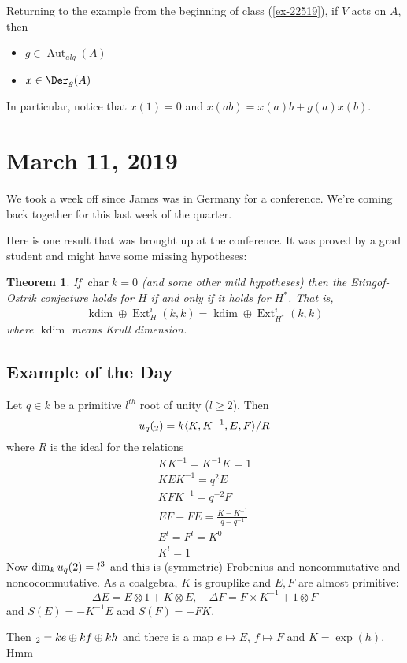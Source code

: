 \documentclass[12pt]{article}
\theoremstyle{break}
\theoremstyle{nonumberbreak}
\theoremstyle{changebreak}
\newtheorem{thm}{Theorem}[subsection]
\theoremstyle{break}
\theoremstyle{nonumberbreak}
\theoremstyle{nonumberplain}
\theoremstyle{change}
\DeclareMathOperator{\Aut}{Aut}
\DeclareMathOperator{\Ext}{Ext}
\DeclareMathOperator{\ch}{char}
\begin{document}
Returning to the example from the beginning of class (\ref{ex-22519}), if $V$ acts on $A$,
then 
\begin{itemize}
	\item $g\in \Aut_{alg}(A)$
	\item $x\in\Der_g(A)$
\end{itemize}
In particular, notice that $x(1)=0$ and $x(ab)=x(a)b+g(a)x(b)$.

\section{March 11, 2019}
We took a week off since James was in Germany for a conference. We're coming back together for this
last week of the quarter.

Here is one result that was brought up at the conference. It was proved by a grad student and might 
have some missing hypotheses:
\begin{thm}
	If $\ch k=0$ (and some other mild hypotheses) then the Etingof-Ostrik conjecture holds for $H$ 
	if and only if it holds for $H^*$. That is,
	\[\operatorname{kdim}\oplus \Ext_H^i(k,k)=\operatorname{kdim}\oplus \Ext^i_{H^*}(k,k)\]
	where $\operatorname{kdim}$ means Krull dimension.
\end{thm}

\subsection{Example of the Day}
\begin{ex}
	Let $q\in k$ be a primitive $l^{th}$ root of unity ($l\ge 2$). Then
	\[u_q(\sl_2)=k\langle K,K^{-1},E,F\rangle/R\]
	where $R$ is the ideal for the relations
	\begin{align*}
		KK^{-1}=K^{-1}K=1\\
		KEK^{-1}=q^2E\\
		KFK^{-1}=q^{-2}F\\
		EF-FE=\frac{K-K^{-1}}{q-q^{-1}}\\
		E^l=F^l=K^0\\
		K^l=1
	\end{align*}
	Now $\dim_k u_q(\sl2)=l^3$ and this is (symmetric) Frobenius and noncommutative and noncocommutative.
	As a coalgebra, $K$ is grouplike and $E,F$ are almost primitive:
	\[\Delta E=E\otimes 1+K\otimes E,\quad \Delta F = F\times K^{-1}+1\otimes F\]
	and $S(E)=-K^{-1}E$ and $S(F)=-FK$.

	Then $\sl_2=ke\oplus kf\oplus kh$ and there is a map $e\mapsto E$, $f\mapsto F$ and $K=\exp(h)$. Hmm
\end{ex}
\end{document}
